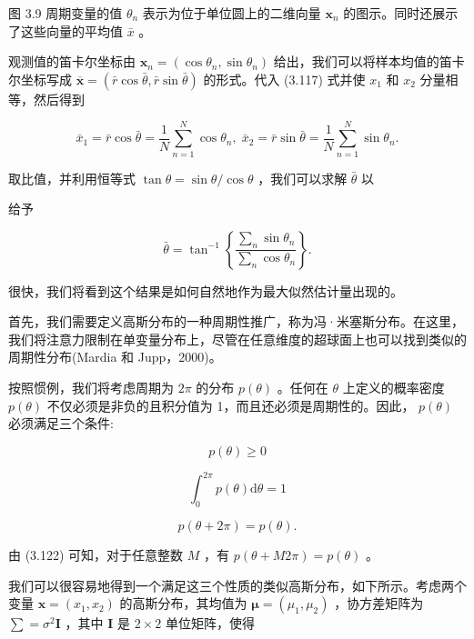 \documentclass[10pt]{report}
\begin{document}
图 3.9 周期变量的值 \({\theta }_{n}\) 表示为位于单位圆上的二维向量 \({\mathbf{x}}_{n}\) 的图示。同时还展示了这些向量的平均值 \(\bar{x}\) 。

观测值的笛卡尔坐标由 \({\mathbf{x}}_{n} = \left( {\cos {\theta }_{n},\sin {\theta }_{n}}\right)\) 给出，我们可以将样本均值的笛卡尔坐标写成 \(\overline{\mathbf{x}} = \left( {\bar{r}\cos \bar{\theta },\bar{r}\sin \bar{\theta }}\right)\) 的形式。代入 (3.117) 式并使 \({x}_{1}\) 和 \({x}_{2}\) 分量相等，然后得到

\[
{\bar{x}}_{1} = \bar{r}\cos \bar{\theta } = \frac{1}{N}\mathop{\sum }\limits_{{n = 1}}^{N}\cos {\theta }_{n},\;{\bar{x}}_{2} = \bar{r}\sin \bar{\theta } = \frac{1}{N}\mathop{\sum }\limits_{{n = 1}}^{N}\sin {\theta }_{n}. \tag{3.118}
\]

取比值，并利用恒等式 \(\tan \theta  = \sin \theta /\cos \theta\) ，我们可以求解 \(\bar{\theta }\) 以

给予

\[
\bar{\theta } = {\tan }^{-1}\left\{  \frac{\mathop{\sum }\limits_{n}\sin {\theta }_{n}}{\mathop{\sum }\limits_{n}\cos {\theta }_{n}}\right\}  . \tag{3.119}
\]

很快，我们将看到这个结果是如何自然地作为最大似然估计量出现的。

首先，我们需要定义高斯分布的一种周期性推广，称为冯·米塞斯分布。在这里，我们将注意力限制在单变量分布上，尽管在任意维度的超球面上也可以找到类似的周期性分布(Mardia 和 Jupp，2000)。

按照惯例，我们将考虑周期为 \({2\pi }\) 的分布 \(p\left( \theta \right)\) 。任何在 \(\theta\) 上定义的概率密度 \(p\left( \theta \right)\) 不仅必须是非负的且积分值为 1，而且还必须是周期性的。因此， \(p\left( \theta \right)\) 必须满足三个条件:

\[
p\left( \theta \right)  \geq  0 \tag{3.120}
\]

\[
{\int }_{0}^{2\pi }p\left( \theta \right) \mathrm{d}\theta  = 1 \tag{3.121}
\]

\[
p\left( {\theta  + {2\pi }}\right)  = p\left( \theta \right) . \tag{3.122}
\]

由 (3.122) 可知，对于任意整数 \(M\) ，有 \(p\left( {\theta  + {M2\pi }}\right)  = p\left( \theta \right)\) 。

我们可以很容易地得到一个满足这三个性质的类似高斯分布，如下所示。考虑两个变量 \(\mathbf{x} = \left( {{x}_{1},{x}_{2}}\right)\) 的高斯分布，其均值为 \(\mathbf{\mu } = \left( {{\mu }_{1},{\mu }_{2}}\right)\) ，协方差矩阵为 \(\mathbf{\sum } = {\sigma }^{2}\mathbf{I}\) ，其中 \(\mathbf{I}\) 是 \(2 \times  2\) 单位矩阵，使得
\end{document}
